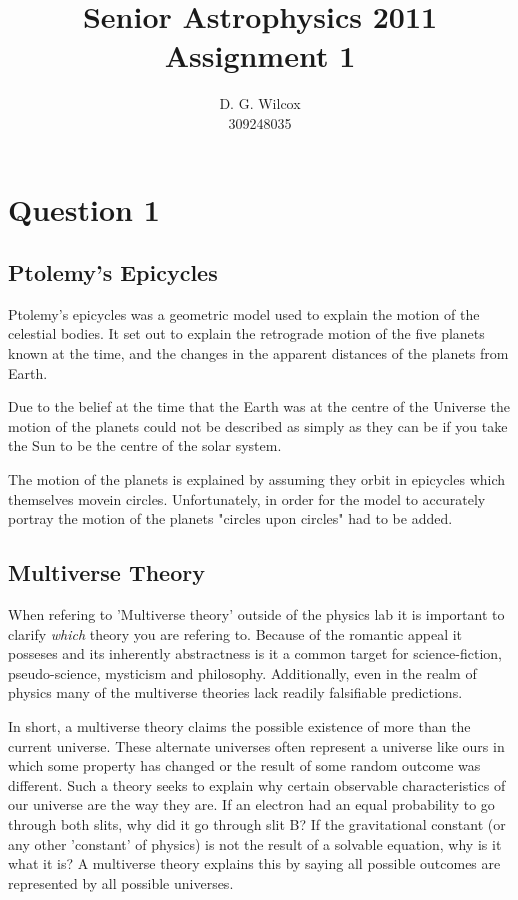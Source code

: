 \documentclass[10pt,a4paper]{article}
\title{Senior Astrophysics 2011 Assignment 1}
\date{}
\author{D. G. Wilcox \\
		309248035}
\begin{document}
\maketitle
\section*{Question 1}

\subsection*{Ptolemy's Epicycles}
Ptolemy's epicycles was a geometric model used to explain the motion of the celestial bodies. It set out to explain the retrograde motion of the five planets known at the time, and the changes in the apparent distances of the planets from Earth.

Due to the belief at the time that the Earth was at the centre of the Universe the motion of the planets could not be described as simply as they can be if you take the Sun to be the centre of the solar system.

The motion of the planets is explained by assuming they orbit in epicycles which themselves movein circles. Unfortunately, in order for the model to accurately portray the motion of the planets "circles upon circles" had to be added.

\subsection*{Multiverse Theory}
When refering to 'Multiverse theory' outside of the physics lab it is important to clarify \textit{which} theory you are refering to. Because of the romantic appeal it posseses and its inherently abstractness is it a common target for science-fiction, pseudo-science, mysticism and philosophy. Additionally, even in the realm of physics many of the multiverse theories lack readily falsifiable predictions.

In short, a multiverse theory claims the possible existence of more than the current universe. These alternate universes often represent a universe like ours in which some property has changed or the result of some random outcome was different. Such a theory seeks to explain why certain observable characteristics of our universe are the way they are. If an electron had an equal probability to go through both slits, why did it go through slit B? If the gravitational constant (or any other 'constant' of physics) is not the result of a solvable equation, why is it what it is? A multiverse theory explains this by saying all possible outcomes are represented by all possible universes.
\end{document}
